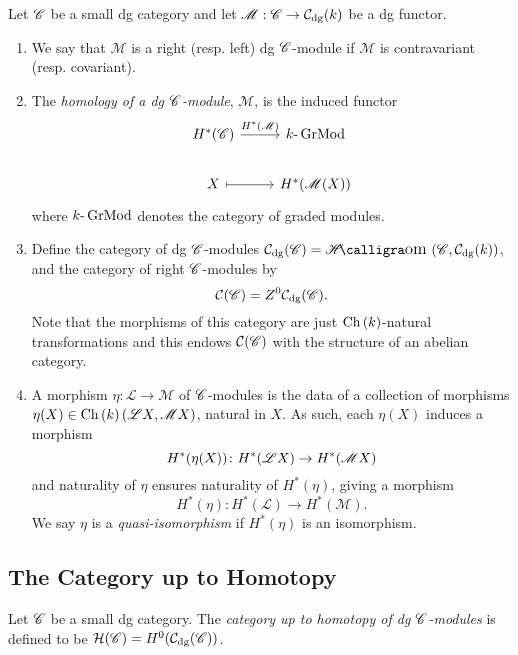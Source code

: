\documentclass[dissertation.tex]{subfiles}
\begin{document}
        \begin{defn}
          Let $\mathscr{C}$ be a small dg category and let $\mathscr{M} : \mathscr{C} \rightarrow \mathcal{C}_\text{dg}(k)$ be a dg functor.
          \begin{enumerate}
          \item
            We say that $\mathscr{M}$ is a right (resp. left) dg $\mathscr{C}$-module if $\mathscr{M}$ is contravariant (resp. covariant).
          \item
            The {\it homology of a dg $\mathscr{C}$-module}, $\mathscr{M}$, is the induced functor
            $$\begin{tikzcd}
              H^\ast(\CC) \arrow{r}{H^\ast(\mathscr{M})}& \Gr{k}\\
              X \arrow[mapsto]{r} & H^\ast(\mathscr{M}(X))
            \end{tikzcd}$$
            where $k\text{-}\operatorname{GrMod}$ denotes the category of graded modules.
          \item
            Define the category of dg $\mathscr{C}$-modules $\mathcal{C}_\text{dg}(\CC) = \SHom{\CC, \mathcal{C}_\text{dg}(k)}$, and the category of right $\mathscr{C}$-modules by
            $$\mathcal{C}(\mathscr{C}) = Z^0 \mathcal{C}_\text{dg}(\mathscr{C}).$$
            Note that the morphisms of this category are just $\operatorname{Ch}\left(k\right)$-natural transformations and this endows $\mathcal{C}(\mathscr{C})$ with the structure of an abelian category.
          \item
            A morphism $\eta \colon \mathscr{L} \rightarrow \mathscr{M}$ of $\mathscr{C}$-modules is the data of a collection of morphisms $\eta(X) \in \operatorname{Ch}\left(k\right)(\mathscr{L}X,\mathscr{M}X)$, natural in $X$.
            As such, each $\eta(X)$ induces a morphism
            $$H^\ast(\eta(X)) \colon H^\ast(\mathscr{L}X) \to H^\ast(\mathscr{M}X)$$
            and naturality of $\eta$ ensures naturality of $H^\ast(\eta)$, giving a morphism
            $$H^\ast(\eta) \colon H^\ast(\mathscr{L}) \rightarrow H^\ast(\mathscr{M}).$$
            We say $\eta$ is a {\it quasi-isomorphism} if $H^\ast(\eta)$ is an isomorphism.
          \end{enumerate}
        \end{defn}

        \subsection{The Category up to Homotopy}
        \begin{defn}
          Let $\mathscr{C}$ be a small dg category.
          The {\it category up to homotopy of dg $\mathscr{C}$-modules} is defined to be $\mathcal{H}(\mathscr{C}) = H^0(\mathcal{C}_\text{dg}(\mathscr{C}))$.
        \end{defn}
\end{document}
